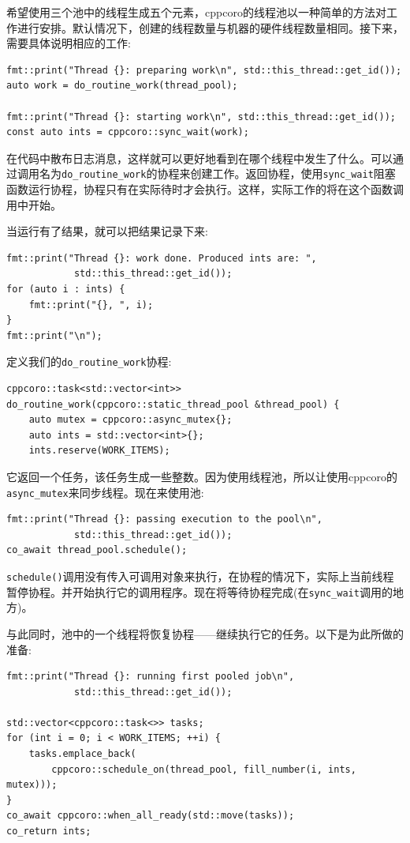 希望使用三个池中的线程生成五个元素，cppcoro的线程池以一种简单的方法对工作进行安排。默认情况下，创建的线程数量与机器的硬件线程数量相同。接下来，需要具体说明相应的工作:

\begin{lstlisting}[style=styleCXX]
fmt::print("Thread {}: preparing work\n", std::this_thread::get_id());
auto work = do_routine_work(thread_pool);

fmt::print("Thread {}: starting work\n", std::this_thread::get_id());
const auto ints = cppcoro::sync_wait(work);
\end{lstlisting}

在代码中散布日志消息，这样就可以更好地看到在哪个线程中发生了什么。可以通过调用名为\texttt{do\_routine\_work}的协程来创建工作。返回协程，使用\texttt{sync\_wait}阻塞函数运行协程，协程只有在实际待时才会执行。这样，实际工作的将在这个函数调用中开始。

当运行有了结果，就可以把结果记录下来:

\begin{lstlisting}[style=styleCXX]
fmt::print("Thread {}: work done. Produced ints are: ",
			std::this_thread::get_id());
for (auto i : ints) {
	fmt::print("{}, ", i);
}
fmt::print("\n");
\end{lstlisting}

定义我们的\texttt{do\_routine\_work}协程:

\begin{lstlisting}[style=styleCXX]
cppcoro::task<std::vector<int>>
do_routine_work(cppcoro::static_thread_pool &thread_pool) {
	auto mutex = cppcoro::async_mutex{};
	auto ints = std::vector<int>{};
	ints.reserve(WORK_ITEMS);
\end{lstlisting}

它返回一个任务，该任务生成一些整数。因为使用线程池，所以让使用cppcoro的\texttt{async\_mutex}来同步线程。现在来使用池:

\begin{lstlisting}[style=styleCXX]
fmt::print("Thread {}: passing execution to the pool\n",
			std::this_thread::get_id());
co_await thread_pool.schedule();
\end{lstlisting}

\texttt{schedule()}调用没有传入可调用对象来执行，在协程的情况下，实际上当前线程暂停协程。并开始执行它的调用程序。现在将等待协程完成(在\texttt{sync\_wait}调用的地方)。

与此同时，池中的一个线程将恢复协程——继续执行它的任务。以下是为此所做的准备:

\begin{lstlisting}[style=styleCXX]
fmt::print("Thread {}: running first pooled job\n",
			std::this_thread::get_id());
			
std::vector<cppcoro::task<>> tasks;
for (int i = 0; i < WORK_ITEMS; ++i) {
	tasks.emplace_back(
		cppcoro::schedule_on(thread_pool, fill_number(i, ints, mutex)));
}
co_await cppcoro::when_all_ready(std::move(tasks));
co_return ints;
\end{lstlisting}

